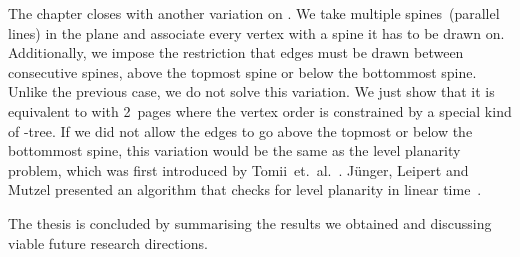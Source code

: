 \begin{description}
The chapter closes with another variation on \probBook. We take multiple spines~(parallel lines)
in the plane and associate every vertex with a spine it has to be drawn on. 
Additionally, we impose the restriction that edges must be drawn between consecutive spines, above the
topmost spine or below the bottommost spine. Unlike the previous case, we do not solve this
variation. We just show that it is equivalent to
\probBook with 2~pages where the vertex order is constrained
by a special kind of \PT-tree. If we did not allow the edges to go
above the topmost or below the bottommost spine, this variation would be the same as the level planarity problem, which was first introduced by Tomii~et.~al.~\cite{Tomii77}. Jünger, Leipert and
Mutzel presented an algorithm that checks for level planarity in linear time~\cite{Junger99}.
\item[\myref{ch:conclusion}] The thesis is concluded by summarising the results
we obtained and discussing viable future research directions.
\end{description}


